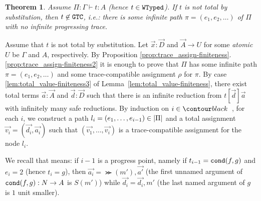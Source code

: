 \documentclass{article}
\newtheorem{theorem}{Theorem}[section]
\newenvironment{proof}[1][Proof]{\begin{trivlist}
\item[\hskip \labelsep {\bfseries #1}]}{\end{trivlist}}
\begin{document}
\begin{theorem}
  Assume $\Pi:\Gamma\vdash t:A$ (hence $t\in {\tt WTyped}$).
  If $t$ is \emph{not} total by substitution, then $t \not \in {\tt GTC}$, i.e.:
  there is some infinite path $\pi = (e_1, e_2, \ldots)$ of $\Pi$ with no infinite progressing trace. 
\end{theorem}



\begin{proof}
  Assume that $t$ is not total by substitution. 
  Let $\vec{x}:\vec{D}$ and $\vec{A}\rightarrow U$ for some \emph{atomic} $U$ 
 be $\Gamma$ and $A$, respectively.
  By Proposition \ref{prop:trace_assign-finiteness}.\ref{prop:trace_assign-finiteness2} it is enough to prove that
  $\Pi$ has some infinite path $\pi=(e_1, e_2, \ldots)$ 
  and some trace-compatible assignment $\rho$ for $\pi$.
  By case \ref{lem:total_value-finiteness3} of Lemma~\ref{lem:total_value-finiteness},
  there exist total terms $\vec{a}:\vec{A}$ and $\vec{d}:\vec{D}$ such that there is
  an infinite reduction from $t[\vec{d}]\vec{a}$ with infinitely many safe reductions. 
  By induction on $i \in \Nat$, for each $i$, we construct a path 
  $l_i = (e_1,\ldots,e_{i-1}) \in {|\Pi|}$
  and a total assignment $\vec{v_i} = (\vec{d_i},\vec{a_i})$ such that
  $(\vec{v_1},\ldots,\vec{v_i})$ is a trace-compatible assignment for the node $l_i$. 

  
 We recall that  means: 
 if $i-1$ is a progress point, namely if $t_{i-1}={\tt cond}(f,g)$ and $e_i=2$ 
    (hence $t_i=g$),
    then $\vec{a_i} = \Succ(m'),\vec{a'}$ 
     (the first unnamed argument of ${\tt cond}(f,g):{N} \rightarrow A$ is $S(m')$)
     while $\vec{d_i} = \vec{d_i},m'$ 
     (the last named argument of $g$ is $1$ unit smaller).


\end{proof}
\end{document}
